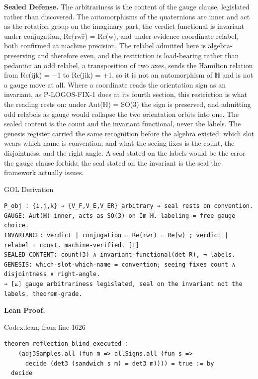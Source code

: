 \documentclass[10pt,twocolumn]{article}
\begin{document}
\textbf{Sealed Defense.} The arbitrariness is the content of the gauge
clause, legislated rather than discovered. The automorphisms of the
quaternions are inner and act as the rotation group on the imaginary
part, the verdict functional is invariant under conjugation, Re(rwr̄) =
Re(w), and under evidence-coordinate relabel, both confirmed at machine
precision. The relabel admitted here is algebra-preserving and therefore
even, and the restriction is load-bearing rather than pedantic: an odd
relabel, a transposition of two axes, sends the Hamilton relation from
Re(ijk) = −1 to Re(jik) = +1, so it is not an automorphism of ℍ and is
not a gauge move at all. Where a coordinate reads the orientation sign
as an invariant, as P-LOGOS-FIX-1 does at its fourth section, this
restriction is what the reading rests on: under Aut(ℍ) = SO(3) the sign
is preserved, and admitting odd relabels as gauge would collapse the two
orientation orbits into one. The sealed content is the count and the
invariant functional, never the labels. The genesis register carried the
same recognition before the algebra existed: which slot wears which name
is convention, and what the seeing fixes is the count, the disjointness,
and the right angle. A seal stated on the labels would be the error the
gauge clause forbids; the seal stated on the invariant is the seal the
framework actually issues.

\begin{golbox}{GOL Derivation}
\begin{lstlisting}[style=golv]
P_obj : {i,j,k} → {V_F,V_E,V_ER} arbitrary ⇒ seal rests on convention.
GAUGE: Aut(ℍ) inner, acts as SO(3) on Im ℍ. labeling = free gauge choice.
INVARIANCE: verdict | conjugation = Re(rwr̄) = Re(w) ; verdict | relabel = const. machine-verified. [T]
SEALED CONTENT: count(3) ∧ invariant-functional(det R), ¬ labels.
GENESIS: which-slot-which-name = convention; seeing fixes count ∧ disjointness ∧ right-angle.
⇒ [⟀] gauge arbitrariness legislated, seal on the invariant not the labels. theorem-grade.
\end{lstlisting}
\end{golbox}

\textbf{Lean Proof.}

\begin{leanexcerpt}{Codex.lean, from line 1626}
\begin{lstlisting}[style=leanx,firstnumber=1626]
theorem reflection_blind_executed :
    (adj3Samples.all (fun m => allSigns.all (fun s =>
      decide (det3 (sandwich s m) = det3 m)))) = true := by
  decide
\end{lstlisting}
\end{leanexcerpt}
\end{document}
